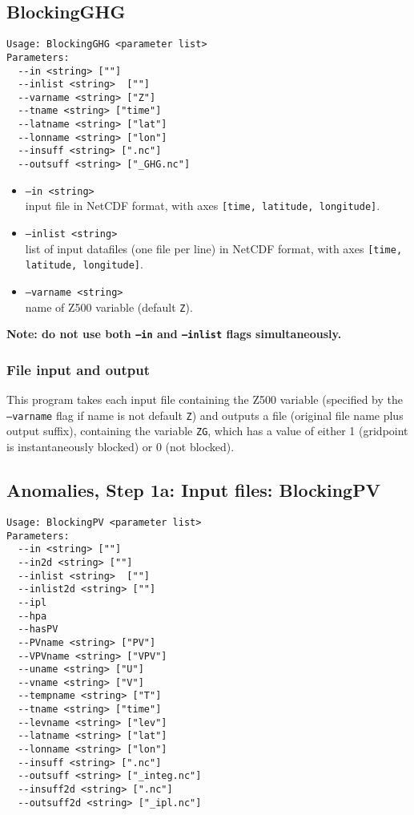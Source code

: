 \documentclass{article}
\begin{document}
\subsection{BlockingGHG}\label{ghg}

\begin{verbatim}
Usage: BlockingGHG <parameter list>
Parameters:
  --in <string> [""]
  --inlist <string>  [""]
  --varname <string> ["Z"]
  --tname <string> ["time"]
  --latname <string> ["lat"]
  --lonname <string> ["lon"]
  --insuff <string> [".nc"]
  --outsuff <string> ["_GHG.nc"]
\end{verbatim}

\begin{itemize}
\item[]\texttt{--in <string>} \\ input file in NetCDF format, with axes \texttt{[time, latitude, longitude]}. 
\item[]\texttt{--inlist <string>}\\ list of input datafiles (one file per line) in NetCDF format, with axes \texttt{[time, latitude, longitude]}. 
\item[] \texttt{--varname <string>}\\ name of Z500 variable (default \texttt{Z}).
\end{itemize}

\textbf{Note: do not use both \texttt{--in} and \texttt{--inlist} flags simultaneously.}


\subsubsection{File input and output}


This program takes each input file containing the Z500 variable (specified by the \texttt{--varname} flag if name is not default \texttt{Z}) and outputs a file (original file name plus output suffix), containing the variable \texttt{ZG}, which has a value of either 1 (gridpoint is instantaneously blocked) or 0 (not blocked).





\subsection{Anomalies, Step 1a: Input files: BlockingPV}\label{PV}
\begin{verbatim}
Usage: BlockingPV <parameter list>
Parameters:
  --in <string> [""]
  --in2d <string> [""]
  --inlist <string>  [""]
  --inlist2d <string> [""]
  --ipl
  --hpa
  --hasPV
  --PVname <string> ["PV"]
  --VPVname <string> ["VPV"]
  --uname <string> ["U"]
  --vname <string> ["V"]
  --tempname <string> ["T"]
  --tname <string> ["time"]
  --levname <string> ["lev"]
  --latname <string> ["lat"]
  --lonname <string> ["lon"]
  --insuff <string> [".nc"]
  --outsuff <string> ["_integ.nc"]
  --insuff2d <string> [".nc"]
  --outsuff2d <string> ["_ipl.nc"]
\end{verbatim}
\end{document}

